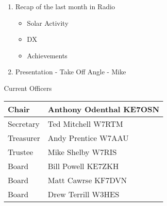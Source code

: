 \documentclass[letter,11pt]{extarticle}
\begin{document}
\begin{enumerate}
\begin{itemize}
		\end{itemize}
		\item Recap of the last month in Radio
		\begin{itemize}
			\item Solar Activity
			\item DX
			\item Achievements
		\end{itemize}
		\item  Presentation - Take Off Angle - Mike
		
	\end{enumerate}
	
	
	Current Officers \\
	\begin{tabular}{|l|l|} \hline
		Chair & Anthony Odenthal KE7OSN \\ \hline
		Secretary & Ted Mitchell W7RTM \\ \hline
		Treasurer & Andy Prentice W7AAU \\ \hline
		Trustee & Mike Shelby W7RIS   \\ \hline
		Board & Bill Powell KE7ZKH \\ \hline
		Board & Matt Cawrse KF7DVN \\ \hline
		Board & Drew Terrill W3HES\\ \hline
	\end{tabular}
	
	\subsection*{}
	
\end{document}
